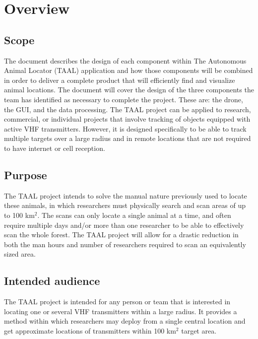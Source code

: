 \documentclass[onecolumn, draftclsnofoot,10pt, compsoc]{IEEEtran}
\begin{document}
\newpage
{}
\tableofcontents
\clearpage

\section{Overview}

\subsection{Scope}

The document describes the design of each component within The Autonomous Animal Locator (TAAL) application and how those components will be combined in order to deliver a complete product that will efficiently find and visualize animal locations.
The document will cover the design of the three components the team has identified as necessary to complete the project.
These are: the drone, the GUI, and the data processing.
\newline
\newline
The TAAL project can be applied to research, commercial, or individual projects that involve tracking of objects equipped with active VHF transmitters.
However, it is designed specifically to be able to track multiple targets over a large radius and in remote locations that are not required to have internet or cell reception.

\subsection{Purpose}

The TAAL project intends to solve the manual nature previously used to locate these animals, in which researchers must physically search and scan areas of up to 100 km${^{2}}$.
The scans can only locate a single animal at a time, and often require multiple days and/or more than one researcher to be able to effectively scan the whole forest.
The TAAL project will allow for a drastic reduction in both the man hours and number of researchers required to scan an equivalently sized area.

\subsection{Intended audience}

The TAAL project is intended for any person or team that is interested in locating one or several VHF transmitters within a large radius.
It provides a method within which researchers may deploy from a single central location and get approximate locations of transmitters within 100 km${^{2}}$ target area.
\end{document}
